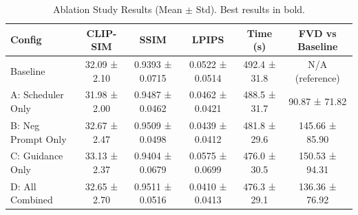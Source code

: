 \begin{table}
\caption{Ablation Study Results (Mean $\pm$ Std). Best results in bold.}
\label{tab:ablation_results}
\begin{tabular}{lccccc}
\toprule
Config & CLIP-SIM & SSIM & LPIPS & Time (s) & FVD vs Baseline \\
\midrule
Baseline & 32.09 ± 2.10 & 0.9393 ± 0.0715 & 0.0522 ± 0.0514 & 492.4 ± 31.8 & N/A (reference) \\
A: Scheduler Only & 31.98 ± 2.00 & 0.9487 ± 0.0462 & 0.0462 ± 0.0421 & 488.5 ± 31.7 & 90.87 ± 71.82 \\
B: Neg Prompt Only & 32.67 ± 2.47 & 0.9509 ± 0.0498 & 0.0439 ± 0.0412 & 481.8 ± 29.6 & 145.66 ± 85.90 \\
C: Guidance Only & 33.13 ± 2.37 & 0.9404 ± 0.0679 & 0.0575 ± 0.0699 & 476.0 ± 30.5 & 150.53 ± 94.31 \\
D: All Combined & 32.65 ± 2.70 & 0.9511 ± 0.0516 & 0.0410 ± 0.0413 & 476.3 ± 29.1 & 136.36 ± 76.92 \\
\bottomrule
\end{tabular}
\end{table}
